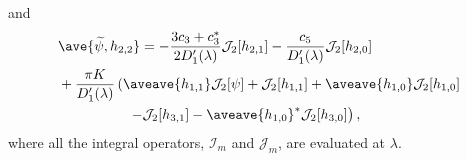 and
\begin{equation}
  \begin{split}
    & \ave{\widetilde{\psi},h_{2,2}}
    = - \dfrac{3c_{3}+c_{3}^{\ast}}{2D_{1}'(\lambda)} \mathcal{J}_{2}[h_{2,1}]
    - \dfrac{c_{5}}{D_{1}'(\lambda)} \mathcal{J}_{2}[h_{2,0}] \\
   & + \dfrac{\pi K}{D_{1}'(\lambda)} \left(
     \aveave{h_{1,1}} \mathcal{J}_{2}[\psi] + \mathcal{J}_{2}[h_{1,1}]
     + \aveave{h_{1,0}} \mathcal{J}_{2}[h_{1,0}] \right. \\
   & \hspace*{5em} \left.
     - \mathcal{J}_{2}[h_{3,1}]
     - \aveave{h_{1,0}}^{\ast} \mathcal{J}_{2}[h_{3,0}]
   \right),
  \end{split}
\end{equation}
where all the integral operators,
$\mathcal{I}_{m}$ and $\mathcal{J}_{m}$, are
evaluated at $\lambda$.






